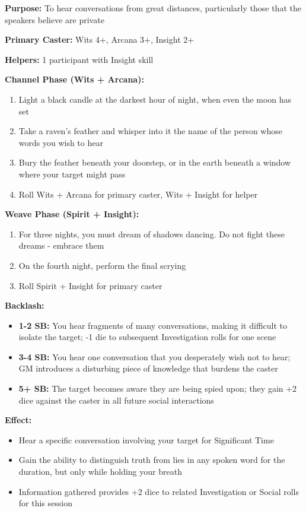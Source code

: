 \textbf{Purpose:} To hear conversations from great distances, particularly those that the speakers believe are private

\textbf{Primary Caster:} Wits 4+, Arcana 3+, Insight 2+

\textbf{Helpers:} 1 participant with Insight skill

\textbf{Channel Phase (Wits + Arcana):}
\begin{enumerate}
\item Light a black candle at the darkest hour of night, when even the moon has set
\item Take a raven's feather and whisper into it the name of the person whose words you wish to hear
\item Bury the feather beneath your doorstep, or in the earth beneath a window where your target might pass
\item Roll Wits + Arcana for primary caster, Wits + Insight for helper
\end{enumerate}

\textbf{Weave Phase (Spirit + Insight):}
\begin{enumerate}
\item For three nights, you must dream of shadows dancing. Do not fight these dreams - embrace them
\item On the fourth night, perform the final scrying
\item Roll Spirit + Insight for primary caster
\end{enumerate}

\textbf{Backlash:}
\begin{itemize}
\item \textbf{1-2 SB:} You hear fragments of many conversations, making it difficult to isolate the target; -1 die to subsequent Investigation rolls for one scene
\item \textbf{3-4 SB:} You hear one conversation that you desperately wish not to hear; GM introduces a disturbing piece of knowledge that burdens the caster
\item \textbf{5+ SB:} The target becomes aware they are being spied upon; they gain +2 dice against the caster in all future social interactions
\end{itemize}

\textbf{Effect:}
\begin{itemize}
\item Hear a specific conversation involving your target for Significant Time
\item Gain the ability to distinguish truth from lies in any spoken word for the duration, but only while holding your breath
\item Information gathered provides +2 dice to related Investigation or Social rolls for this session
\end{itemize}

